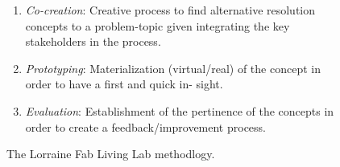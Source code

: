 \documentclass[
  11pt,
]{article}
\providecommand{\tightlist}{%
  \setlength{\itemsep}{0pt}\setlength{\parskip}{0pt}}\usepackage{longtable,booktabs,array}
\begin{document}
\begin{figure}

\begin{minipage}[t]{0.50\linewidth}

{\centering 


\caption{\label{fig-lf2l-methodology}The Lorraine Fab Living Lab
methodlogy.}

}

\end{minipage}%
%
\begin{minipage}[t]{0.50\linewidth}

{\centering 

\begin{enumerate}
\def\labelenumi{\arabic{enumi}.}
\tightlist
\item
  \emph{Co-creation}: Creative process to find alternative resolution
  concepts to a problem-topic given integrating the key stakeholders in
  the process.
\item
  \emph{Prototyping}: Materialization (virtual/real) of the concept in
  order to have a first and quick in- sight.
\item
  \emph{Evaluation}: Establishment of the pertinence of the concepts in
  order to create a feedback/improvement process.
\end{enumerate}

}

\end{minipage}%

\end{figure}
\end{document}
